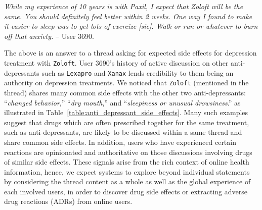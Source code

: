 \documentclass{bmcart}
\begin{document}
{\footnotesize
{\it While my experience of 10 years is with Paxil, I expect that Zoloft will be the same. You should definitely feel better within 2 weeks. One way I found to make it easier to sleep was to get lots of exercize [sic]. Walk or run or whatever to burn off that anxiety.} -- User 3690.
}

The above is an answer to a thread asking for expected side effects for depression treatment with {\tt Zoloft}. User 3690's history of active discussion on other anti-depressants such as {\tt Lexapro} and {\tt Xanax} lends credibility to them being an authority on depression treatments. We noticed that {\tt Zoloft} (mentioned in the thread) shares many common side effects with the other two anti-depressants: ``\textit{changed behavior},'' ``\textit{dry mouth},'' and ``\textit{sleepiness or unusual
drowsiness}.'' as illustrated in 
Table~\ref{table:anti_depressant_side_effects}. Many such examples suggest that drugs which are often prescribed together for the same treatment, such as anti-depressants, are likely to be discussed within a same thread and share common side effects. 
In addition, users who have experienced certain reactions are opinionated and authoritative on those discussions involving drugs of similar side effects. These signals arise from the rich context of online health information, hence, we expect systems to explore beyond individual statements by considering the thread content as a whole as well as the global experience of each involved users, in order to discover drug side effects or extracting 
adverse drug reactions (ADRs) from online users.
\end{document}
